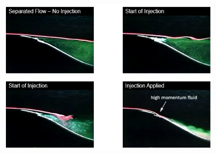 \documentclass[class=report, crop=false, 12pt,a4paper]{standalone}
\begin{document}
\begin{figure}[H]
  \centering
  \includegraphics[width =0.7 \textwidth]{../img/diagram66.png}
\end{figure}
\end{document}
